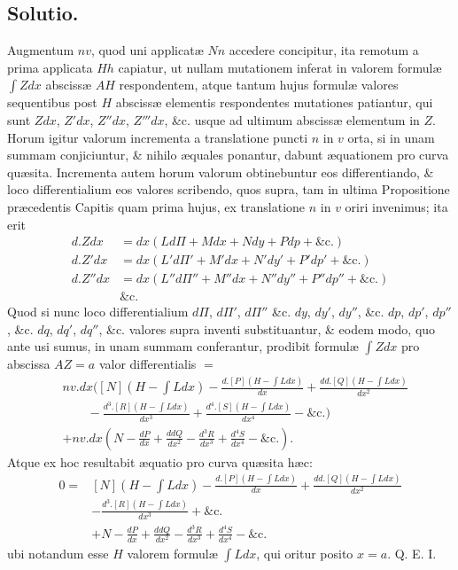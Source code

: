 \subsection*{Solutio.}
Augmentum $nv$, quod uni applicatæ $Nn$ accedere concipitur, ita remotum a prima applicata $Hh$ capiatur, ut nullam mutationem inferat in valorem formulæ $\int Zdx$ abscissæ $AH$ respondentem, atque tantum hujus formulæ valores sequentibus post $H$ abscissæ elementis respondentes mutationes patiantur, qui sunt $Zdx$, $Z'dx$, $Z''dx$, $Z'''dx$, \&c. usque ad ultimum abscissæ elementum in $Z$. Horum igitur valorum incrementa a translatione puncti $n$ in $v$ orta, si in unam summam conjiciuntur, \& nihilo æquales ponantur, dabunt æquationem pro curva quæsita. Incrementa autem horum valorum obtinebuntur eos differentiando, \& loco differentialium eos valores scribendo, quos supra, tam in ultima Propositione præcedentis Capitis quam prima hujus, ex translatione $n$ in $v$ oriri invenimus; ita erit
\[\begin{aligned}
d.Zdx&=dx(Ld\Pi+Mdx+Ndy+Pdp+\text{\&c.})\\
d.Z'dx&=dx(L'd\Pi'+M'dx+N'dy'+P'dp'+\text{\&c.})\\
d.Z''dx&=dx(L''d\Pi''+M''dx+N''dy''+P''dp''+\text{\&c.})\\&\text{\&c.}
\end{aligned}\]
Quod si nunc loco differentialium $d\Pi$, $d\Pi'$, $d\Pi''$ \&c. $dy$, $dy'$, $dy''$, \&c. $dp$, $dp'$, $dp''$, \&c. $dq$, $dq'$, $dq''$, \&c. valores supra inventi substituantur, \& eodem modo, quo ante usi sumus, in unam summam conferantur, prodibit formulæ $\int Zdx$ pro abscissa $AZ=a$ valor differentialis $=$
\[\begin{aligned}
&nv.dx\bigg([N](H-\int Ldx)-\frac{d.[P](H-\int Ldx)}{dx}+\frac{dd.[Q](H-\int Ldx)}{dx^2}\\
&\qquad-\frac{d^3.[R](H-\int Ldx)}{dx^3}+\frac{d^4.[S](H-\int Ldx)}{dx^4}-\text{\&c.}\bigg)\\
&+nv.dx\left(N-\frac{dP}{dx}+\frac{ddQ}{dx^2}-\frac{d^3R}{dx^3}+\frac{d^4S}{dx^4}-\text{\&c.}\right).
\end{aligned}\]
Atque ex hoc resultabit æquatio pro curva quæsita hæc:
\[\begin{aligned}
0={}&[N](H-\int Ldx)-\frac{d.[P](H-\int Ldx)}{dx}+\frac{dd.[Q](H-\int Ldx)}{dx^2}\\&-\frac{d^3.[R](H-\int Ldx)}{dx^3}+\text{\&c.}\\&+N-\frac{dP}{dx}+\frac{ddQ}{dx^2}-\frac{d^3R}{dx^3}+\frac{d^4S}{dx^4}-\text{\&c.}
\end{aligned}\]
ubi notandum esse $H$ valorem formulæ $\int Ldx$, qui oritur posito $x=a$. Q. E. I.
